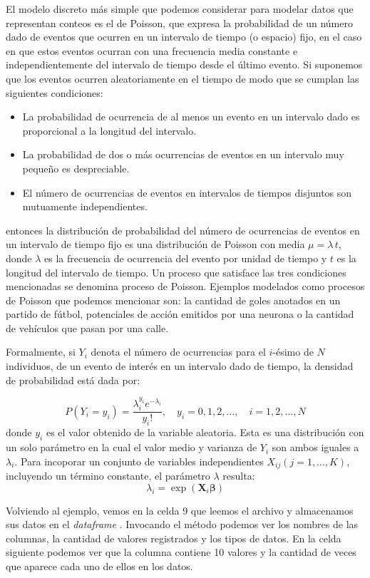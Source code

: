  El modelo discreto más simple que podemos considerar para modelar datos que representan conteos es el de Poisson, que expresa la probabilidad de un número dado de eventos que ocurren en un intervalo de tiempo (o espacio) fijo, en el caso en que estos eventos ocurran con una frecuencia media constante e independientemente del intervalo de tiempo desde el último evento. Si suponemos que los eventos ocurren aleatoriamente en el tiempo de modo que se cumplan las siguientes condiciones:
 \begin{itemize}
  \item La probabilidad de ocurrencia de al menos un evento en un intervalo dado es proporcional a la longitud del intervalo.
  \item La probabilidad de dos o más ocurrencias de eventos en un intervalo muy pequeño es despreciable.
  \item El número de ocurrencias de eventos en intervalos de tiempos disjuntos son mutuamente independientes.
 \end{itemize}
 entonces la distribución de probabilidad del número de ocurrencias de eventos en un intervalo de tiempo fijo es una distribución de Poisson con media $\mu = \lambda \, t$, donde $\lambda$ es la frecuencia de ocurrencia del evento por unidad de tiempo y $t$ es la longitud del intervalo de tiempo. Un proceso que satisface las tres condiciones mencionadas se denomina proceso de Poisson. Ejemplos modelados como procesos de Poisson que podemos mencionar son: la cantidad de goles anotados en un partido de fútbol, potenciales de acción emitidos por una neurona o la cantidad de vehículos que pasan por una calle. 
 
 Formalmente, si $Y_i$ denota el número de ocurrencias para el $i$-ésimo de $N$ individuos, de un evento de interés en un intervalo dado de tiempo, la densidad de probabilidad está dada por:
 
 \[ P(Y_i = y_i) = \frac{\lambda_i^{y_i} e^{-\lambda_i}}{y_i!}, \quad y_i = 0, 1, 2, \ldots, \quad i = 1, 2, \ldots, N  \]
 donde $y_i$ es el valor obtenido de la variable aleatoria. Esta es una distribución con un solo parámetro en la cual el valor medio y varianza de $Y_i$ son ambos iguales a $\lambda_i$. Para incoporar un conjunto de variables independientes $X_{ij}(j = 1, \ldots, K)$, incluyendo un término constante, el parámetro $\lambda$ resulta:
 \[ \lambda_i = \exp(\bm{X}_i \bm{\beta}) \]

Volviendo al ejemplo, vemos en la celda 9 que leemos el archivo  y almacenamos sus datos en el \textit{dataframe} . Invocando el método  podemos ver los nombres de las columnas, la cantidad de valores registrados y los tipos de datos. En la celda siguiente podemos ver que la columna  contiene 10 valores y la cantidad de veces que aparece cada uno de ellos en los datos.
 
